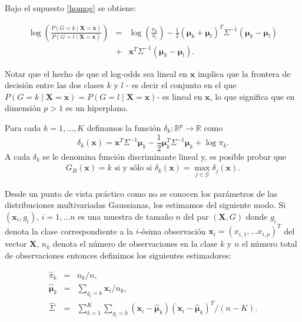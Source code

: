 \documentclass{report}
\begin{document}
Bajo el supuesto \eqref{homog}   se obtiene:

\begin{eqnarray}\label{logoddsnormal}
		\log \left( \frac{P(G=k \mid\mathbf{X}=\mathbf{x})}{P(G=l \mid \mathbf{X}=\mathbf{x})}\right)&= & \log \left(\frac{\pi_k}{\pi_{l}}\right)-\frac{1}{2}\left(\boldsymbol{\mu}_k+\boldsymbol{\mu}_{l}\right)^T \Sigma^{-1}\left(\boldsymbol{\mu}_k-\boldsymbol{\mu}_{l}\right) \nonumber \\  
& +&\mathbf{x}^T \Sigma^{-1}\left(\boldsymbol{\mu}_k-\boldsymbol{\mu}_{l}\right).
\end{eqnarray}
 

 

Notar que el hecho de que el log-odds sea lineal en $\mathbf{x}$ implica que la frontera de decisión entre las dos clases $k$ y $l$ - es decir el conjunto en el que 
$P(G=k \mid\mathbf{X}=\mathbf{x})=P(G=l \mid\mathbf{X}=\mathbf{x})$- es lineal en $\mathbf{x}$, lo que significa  que en dimensión $p>1$ es un hiperplano.
 

 

Para cada $k=1, \ldots, K$ definamos la función $\delta_k:\mathbb{R}^p\rightarrow \mathbb{R}$ como
$$  
\delta_k(\mathbf{x})=\mathbf{x}^T \Sigma^{-1} \boldsymbol{\mu}_k-\frac{1}{2} \boldsymbol{\mu}_k^T \Sigma^{-1} \boldsymbol{\mu}_k+\log \pi_k.
$$
A cada $\delta_k$ se le denomina función discriminante lineal y, es posible probar que
 \begin{eqnarray}\label{clasBayeslda}
G_B(\mathbf{x})=k \text { si y sólo si } \delta_k(\mathbf{x})=\max _{j \in \mathcal{G}}  \delta_j(\mathbf{x}).
\end{eqnarray}

Desde un punto de vista práctico como no se conocen los parámetros de las distribuciones multivariadas Gaussianas, los estimamos del siguiente modo. Si  $(\mathbf{x}_i, g_i)$, $i=1,\ldots n$ es una muestra de tamaño $n$ del par $(\mathbf{X}, G)$ donde $g_i$ denota la clase correspondiente a la $i$-ésima observación $\mathbf{x}_i=(x_{i,1}, \ldots x_{i,p})^T$ del vector  $\mathbf{X}$, $n_k$ denota el número de observaciones en la clase $k$ y  $n$ el número total de observaciones entonces definimos los siguientes estimadores: 

\begin{eqnarray}\label{clasBayesldaesti}
\hat{\pi}_k&=& n_k / n,\nonumber \\
\hat{\boldsymbol{\mu}}_k &=& \sum_{g_i=k} \mathbf{x}_i / n_k,  \\ 
\hat{\Sigma} &=& \sum_{k=1}^K\sum_{g_i=k}\left(\mathbf{x}_i-\hat{\boldsymbol{\mu}}_k\right)\left(\mathbf{x}_i-\hat{\boldsymbol{\mu}}_k\right)^T /(n-K). \nonumber
\end{eqnarray}
\end{document}
